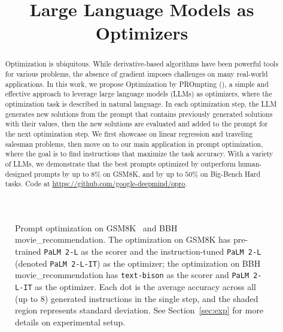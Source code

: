 \title{Large Language Models as Optimizers}



\maketitle
\thispagestyle{firstpage}
\vspace{-1em}
\begin{abstract}
Optimization is ubiquitous. While derivative-based algorithms have been powerful tools for various problems, the absence of gradient imposes challenges on many real-world applications.
In this work, we propose Optimization by PROmpting (\name{}), a simple and effective approach to leverage large language models (LLMs) as optimizers, where the optimization task is described in natural language. In each optimization step, the LLM generates new solutions from the prompt that contains previously generated solutions with their values, then the new solutions are evaluated and added to the prompt for the next optimization step. We first showcase \name{} on linear regression and traveling salesman problems, then move on to our main application in prompt optimization, where the goal is to find instructions that maximize the task accuracy. With a variety of LLMs, we demonstrate that the best prompts optimized by \name{} outperform human-designed prompts by up to $8\%$ on GSM8K, and by up to $50\%$ on Big-Bench Hard tasks.
Code at \url{https://github.com/google-deepmind/opro}.
\end{abstract}

\vspace{-1em}
\begin{figure}[H]
\centering
{}
\caption{Prompt optimization on GSM8K~\citep{cobbe2021training} and BBH~\citep{suzgun2022challenging} movie\_recommendation. 
The optimization on GSM8K has pre-trained \texttt{PaLM 2-L} as the scorer and the instruction-tuned \texttt{PaLM 2-L} (denoted \texttt{PaLM 2-L-IT}) as the optimizer; the optimization on BBH movie\_recommendation has \texttt{text-bison} as the scorer and \texttt{PaLM 2-L-IT} as the optimizer.
Each dot is the average accuracy across all (up to 8) generated instructions in the single step, and the shaded region represents standard deviation.
See Section~\ref{sec:exp} for more details on experimental setup.}
\label{fig:prompt_optimization_graph_in_intro}
\end{figure}

